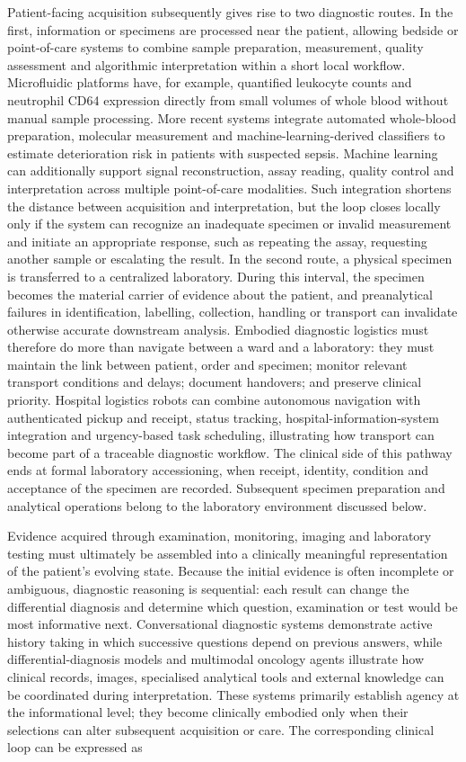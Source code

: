 \documentclass[12pt,a4paper]{article}
\begin{document}
Patient-facing acquisition subsequently gives rise to two diagnostic routes. In the first, information or specimens are processed near the patient, allowing bedside or point-of-care systems to combine sample preparation, measurement, quality assessment and algorithmic interpretation within a short local workflow. Microfluidic platforms have, for example, quantified leukocyte counts and neutrophil CD64 expression directly from small volumes of whole blood without manual sample processing. More recent systems integrate automated whole-blood preparation, molecular measurement and machine-learning-derived classifiers to estimate deterioration risk in patients with suspected sepsis. Machine learning can additionally support signal reconstruction, assay reading, quality control and interpretation across multiple point-of-care modalities. Such integration shortens the distance between acquisition and interpretation, but the loop closes locally only if the system can recognize an inadequate specimen or invalid measurement and initiate an appropriate response, such as repeating the assay, requesting another sample or escalating the result. In the second route, a physical specimen is transferred to a centralized laboratory. During this interval, the specimen becomes the material carrier of evidence about the patient, and preanalytical failures in identification, labelling, collection, handling or transport can invalidate otherwise accurate downstream analysis. Embodied diagnostic logistics must therefore do more than navigate between a ward and a laboratory: they must maintain the link between patient, order and specimen; monitor relevant transport conditions and delays; document handovers; and preserve clinical priority. Hospital logistics robots can combine autonomous navigation with authenticated pickup and receipt, status tracking, hospital-information-system integration and urgency-based task scheduling, illustrating how transport can become part of a traceable diagnostic workflow. The clinical side of this pathway ends at formal laboratory accessioning, when receipt, identity, condition and acceptance of the specimen are recorded. Subsequent specimen preparation and analytical operations belong to the laboratory environment discussed below.

Evidence acquired through examination, monitoring, imaging and laboratory testing must ultimately be assembled into a clinically meaningful representation of the patient's evolving state. Because the initial evidence is often incomplete or ambiguous, diagnostic reasoning is sequential: each result can change the differential diagnosis and determine which question, examination or test would be most informative next. Conversational diagnostic systems demonstrate active history taking in which successive questions depend on previous answers, while differential-diagnosis models and multimodal oncology agents illustrate how clinical records, images, specialised analytical tools and external knowledge can be coordinated during interpretation. These systems primarily establish agency at the informational level; they become clinically embodied only when their selections can alter subsequent acquisition or care. The corresponding clinical loop can be expressed as
\end{document}

